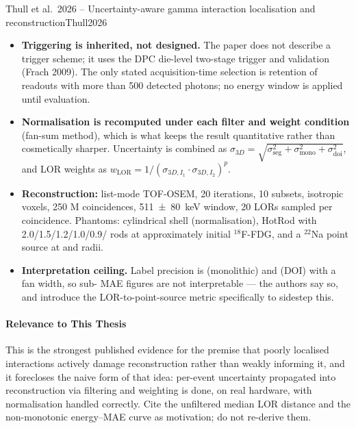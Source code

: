 \begin{papernote}{Thull et al.\ 2026 -- Uncertainty-aware gamma interaction localisation and reconstruction}{Thull2026}
\begin{itemize}
    \item \textbf{Triggering is inherited, not designed.} The paper does not describe a
        trigger scheme; it uses the DPC die-level two-stage trigger and validation (Frach
        2009). The only stated acquisition-time selection is retention of readouts with
        more than 500 detected photons; no energy window is applied until evaluation.
    \item \textbf{Normalisation is recomputed under each filter and weight condition}
        (fan-sum method), which is what keeps the result quantitative rather than
        cosmetically sharper. Uncertainty is combined as
        $\sigma_{3D} = \sqrt{\sigma^2_{\mathrm{seg}} + \sigma^2_{\mathrm{mono}} +
        \sigma^2_{\mathrm{doi}}}$, and LOR weights as
        $w_{\mathrm{LOR}} = 1 / (\sigma_{3D,I_1} \cdot \sigma_{3D,I_2})^p$.
    \item \textbf{Reconstruction:} list-mode TOF-OSEM, 20 iterations, 10 subsets,
         isotropic voxels, 250 M coincidences,
        \qty[separate-uncertainty=true]{511 \pm 80}{\kilo\electronvolt} window,
        20 LORs sampled per coincidence. Phantoms: cylindrical shell (normalisation),
        HotRod with 2.0/1.5/1.2/1.0/0.9/ rods at approximately  initial
        $^{18}$F-FDG, and a  $^{22}$Na point source at  and  radii.
    \item \textbf{Interpretation ceiling.} Label precision is  (monolithic) and
         (DOI) with a  fan width, so sub- MAE figures are not
        interpretable --- the authors say so, and introduce the LOR-to-point-source metric
        specifically to sidestep this.
\end{itemize}

\paragraph{Relevance to This Thesis}
This is the strongest published evidence for the premise that poorly localised
interactions actively damage reconstruction rather than weakly informing it, and it
forecloses the naive form of that idea: per-event uncertainty propagated into
reconstruction via filtering and weighting is done, on real hardware, with normalisation
handled correctly. Cite the  unfiltered median LOR distance and the non-monotonic
energy--MAE curve as motivation; do not re-derive them.


\end{papernote}

